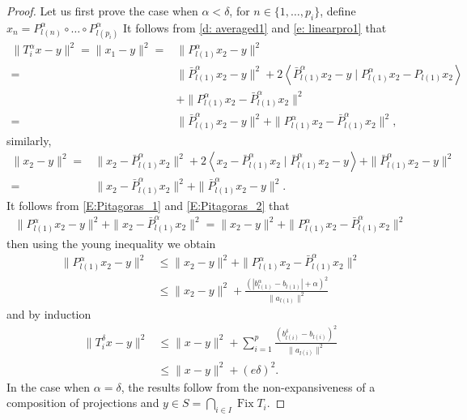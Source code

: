 \documentclass[11pt]{report}
\newcommand{\scal}[2]{{\left\langle{{#1}\mid{#2}}\right\rangle}}
\newcommand{\Fix}{\ensuremath{\operatorname{Fix}}}
\theoremstyle{plain}{\theorembodyfont{\rmfamily}%
\newtheorem{assumption}[theorem]{Assumption}}
\theoremstyle{plain}{\theorembodyfont{\rmfamily}%
\newtheorem{algorithm}[theorem]{Algorithm}}
\theoremstyle{plain}{\theorembodyfont{\rmfamily}%
\newtheorem{example}[theorem]{Example}}
\theoremstyle{plain}{\theorembodyfont{\rmfamily}%
\newtheorem{remark}[theorem]{Remark}}
\theoremstyle{plain}{\theorembodyfont{\rmfamily}%
\newtheorem{definition}[theorem]{Definition}}
\theoremstyle{plain}{\theorembodyfont{\rmfamily}%
\newtheorem{problem}[theorem]{Problem}}
\numberwithin{equation}{chapter}
\newcommand{\prim}{x}
\begin{document}
\begin{proof}    Let us first prove the case when $\alpha<\delta$, for $n\in\{1,\dots,p_i\}$, define $\prim_n=P^\alpha_{l(n)}\circ\ldots\circ P^\alpha_{l(p_i)}$  
It follows from \eqref{d: averaged1} and \eqref{e: linearpro1} that
\begin{align}
    \|T^\alpha_{i}\prim-y\|^2= \|\prim_{1}-y\|^2=&\|P^\alpha_{l(1)}\prim_{2}-y\|^2\nonumber\\=&\|\bar{P}^{\alpha}_{l(1)}\prim_{2}-y\|^2+2\scal{\bar{P}^{\alpha}_{l(1)}\prim_{2}-y}{P^{\alpha}_{l(1)}\prim_{2}-P_{l(1)}\prim_{2}}\nonumber\\&+\|P^{\alpha}_{l(1)}\prim_{2}-\bar{P}^{\alpha}_{l(1)}\prim_{2}\|^2\nonumber\\=&\|\bar{P}^{\alpha}_{l(1)}\prim_{2}-y\|^2+\|P^{\alpha}_{l(1)}\prim_{2}-\bar{P}^{\alpha}_{l(1)}\prim_{2}\|^2,
    \label{E:Pitagoras_1}
    \end{align}
    similarly,
    \begin{align}
        \|\prim_2-y\|^2=&\|\prim_2-\bar{P}^{\alpha}_{l(1)}\prim_2\|^2+2\scal{\prim_2-\bar{P}^{\alpha}_{l(1)}\prim_2}{\bar{P}^{\alpha}_{l(1)}\prim_2-y}+\|\bar{P}^{\alpha}_{l(1)}\prim_2-y\|^2\nonumber\\=&\|\prim_2-\bar{P}^{\alpha}_{l(1)}\prim_2\|^2+\|\bar{P}^{\alpha}_{l(1)}\prim_2-y\|^2.
        \label{E:Pitagoras_2}
    \end{align}
    It follows from \eqref{E:Pitagoras_1} and \eqref{E:Pitagoras_2} that
    \begin{align}
        \|P^{\alpha}_{l(1)}\prim_2-y\|^2+\|\prim_2-\bar{P}^{\alpha}_{l(1)}\prim_2\|^2=\|\prim_2-y\|^2+\|P^{\alpha}_{l(1)}\prim_{2}-\bar{P}^{\alpha}_{l(1)}\prim_{2}\|^2
    \end{align}
    then using the young inequality we obtain
    \begin{align}
        \|P^{\alpha}_{l(1)}\prim_2-y\|^2&\leq\|\prim_2-y\|^2+\|P^{\alpha}_{l(1)}\prim_{2}-\bar{P}^{\alpha}_{l(1)}\prim_{2}\|^2\nonumber\\ &\leq \|\prim_2-y\|^2+\frac{\left(|b^{\alpha}_{l(1)}-b_{l(1)}|+\alpha\right)^2}{\|a_{l(1)}\|^2}
    \end{align}
and by induction
\begin{align}
\|T^\delta_{i}\prim-y\|^2&\leq\|\prim-y\|^2+\sum_{i=1}^{p}\frac{(b^{\delta}_{l(i)}-b_{l(i)})^2}{\|a_{l(i)}\|^2}\nonumber\\&\leq\|\prim-y\|^2+(e\delta)^2.
\end{align}In the case when $\alpha=\delta$, the results follow from the non-expansiveness of a composition of projections and $y\in S=\bigcap\limits_{i\in I}\Fix T_{i}$.
\end{proof}
\end{document}
